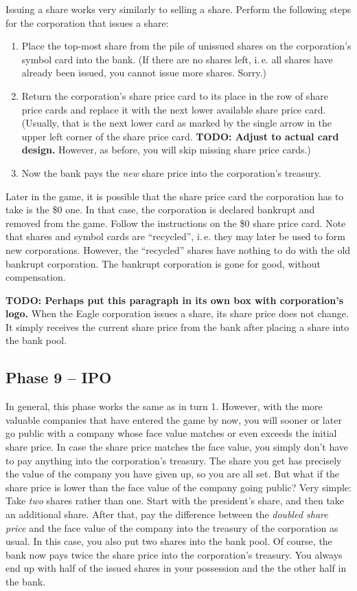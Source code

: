 \documentclass[10pt,final]{report}
\begin{document}
\begin{multicols}{2}
Issuing a share works very similarly to selling a share. Perform the
following steps for the corporation that issues a share:
\begin{enumerate}
\item Place the top-most share from the pile of unissued shares on the
  corporation's symbol card into the bank. (If there are no shares
  left, i.\,e. all shares have already been issued, you cannot
  issue more shares. Sorry.)
\item Return the corporation's share price card to its place in the
  row of share price cards and replace it with the next lower
  available share price card. (Usually, that is the next lower card as
  marked by the single arrow in the upper left corner of the share
  price card. \textbf{TODO: Adjust to actual card design.}  However,
  as before, you will skip missing share price cards.)
\item Now the bank pays the \emph{new} share price into the
  corporation's treasury.
\end{enumerate}

Later in the game, it is possible that the share price card the
corporation has to take is the \$0 one. In that case, the corporation
is declared bankrupt and removed from the game. Follow the
instructions on the \$0 share price card. Note that shares and symbol
cards are ``recycled'', i.\,e. they may later be used to form new
corporations. However, the ``recycled'' shares have nothing to do with
the old bankrupt corporation. The bankrupt corporation is gone for
good, without compensation.

\textbf{TODO: Perhaps put this paragraph in its own box with
  corporation's logo.} When the Eagle corporation issues a share, its
share price does not change. It simply receives the current share
price from the bank after placing a share into the bank pool.

\subsection{Phase 9 -- IPO}

In general, this phase works the same as in turn 1. However, with the
more valuable companies that have entered the game by now, you will
sooner or later go public with a company whose face value matches or
even exceeds the initial share price. In case the share price matches
the face value, you simply don't have to pay anything into the
corporation's treasury. The share you get has precisely the value of
the company you have given up, so you are all set. But what if the
share price is lower than the face value of the company going public?
Very simple: Take \emph{two} shares rather than one. Start with the
president's share, and then take an additional share. After that, pay
the difference between the \emph{doubled share price} and the face
value of the company into the treasury of the corporation as usual. In
this case, you also put two shares into the bank pool. Of course, the
bank now pays twice the share price into the corporation's
treasury. You always end up with half of the issued shares in your
possession and the the other half in the bank.


\end{multicols}
\end{document}
